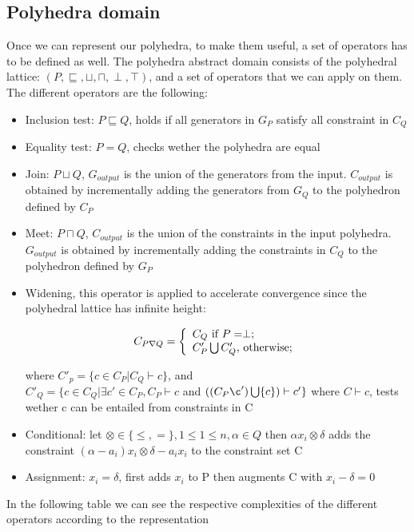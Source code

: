 \subsection{Polyhedra domain}
Once we can represent our polyhedra, to make them useful, a set of operators has to be defined as well. The polyhedra abstract domain consists of the polyhedral lattice:
	$(P,\sqsubseteq,\sqcup,\sqcap,\perp,\top)$, and a set of operators that we can apply on them. The different operators are the following:
	\begin{itemize}
		\item Inclusion test: $P \sqsubseteq Q$, holds if all generators in $G_P$ satisfy all constraint in $C_Q$
		\item Equality test: $P=Q$, checks wether the polyhedra are equal
		\item Join: $P\sqcup Q$, $G_{output}$ is the union of the generators from the input. $C_{output}$ is obtained by incrementally adding the generators from $G_Q$ to the polyhedron defined by $C_P$
		\item Meet: $P\sqcap Q$, $C_{output}$ is the union of the constraints in the input polyhedra. $G_{output}$ is obtained by incrementally adding the constraints in $C_Q$ to the polyhedron defined by $G_P$
		\item Widening, this operator is applied to accelerate convergence since the polyhedral lattice has infinite height:
		\begin{center}
		  \[
    C_{P\nabla Q}=\left\{
                \begin{array}{ll}
                  C_Q $ if $P=\perp ;\\
                  C'_P\bigcup C'_Q, $ otherwise$;
                \end{array}
              \right.
  	\]
		
		\end{center}

		where $C'_p=\{c\in C_P |C_Q \vdash c \}$, and\\  $C'_Q=\{c\in C_Q |\exists c' \in C_P,C_P \vdash c $ and $((C_P\c')\bigcup \{c\})\vdash c' \}$
		where $C\vdash c$, tests wether c can be entailed from constraints in C
		\item Conditional: let $\otimes \in \{\leq,=\},1\leq 1\leq n,\alpha \in Q$ then $\alpha x_i \otimes \delta$ adds the constraint $(\alpha-a_i)x_i \otimes\delta - a_i x_i$ to the constraint set C
		\item Assignment: $x_i = \delta$, first adds $x_i$ to P then augments C with $x_i -\delta = 0$
		
	\end{itemize}
	 In the following table we can see the respective complexities of the different operators according to the representation
	 
